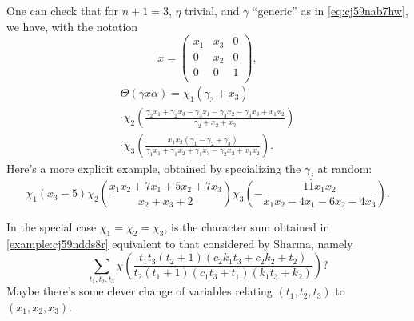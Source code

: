 \documentclass[reqno]{amsart} 
\begin{document}
\begin{example}\label{example:cj59ndds8r}
  One can check that for $n+1=3$, $\eta$ trivial, and $\gamma$ ``generic'' as in \eqref{eq:cj59nab7hw}, we have, with the notation
  \begin{equation*}
x =
\begin{pmatrix}
x_1 & x_3 & 0 \\
0 & x_2 & 0 \\
0 & 0 & 1 \\
\end{pmatrix},
\end{equation*}
  \begin{multline*}
    \Theta(\gamma x \alpha) =
    \chi_1 \left(
      \gamma_{3} + x_{3}
    \right)
    \\ \cdot 
    \chi_2 \left(
      \frac{\gamma_{2} x_{1} + \gamma_{2} x_{3} - \gamma_{3} x_{1} - \gamma_{3} x_{2} - \gamma_{3} x_{3} + x_{1} x_{2}}{\gamma_{2} + x_{2} + x_{3}}
    \right)
    \\ \cdot 
    \chi_3
    \left(
      \frac{x_{1} x_{2} (\gamma_{1} - \gamma_{2} + \gamma_{3})}{\gamma_{1} x_{1} + \gamma_{1} x_{2} + \gamma_{1} x_{3} - \gamma_{2} x_{2} + x_{1} x_{2}}
    \right).
  \end{multline*}
  Here's a more explicit example, obtained by specializing the $\gamma_j$ at random:
  \begin{equation*}
\chi_1 \left(
    x_{3} - 5
  \right)
  \chi_2 \left(
    \frac{x_{1} x_{2} + 7 x_{1} + 5 x_{2} + 7 x_{3}}{x_{2} + x_{3} + 2}\right)
  \chi_3 \left(
  - \frac{11 x_{1} x_{2}}{x_{1} x_{2} - 4 x_{1} - 6 x_{2} - 4 x_{3}}\right).
\end{equation*}
\end{example}

\begin{question}
  In the special case $\chi_1 = \chi_2 = \chi_3$, is the character sum obtained in \ref{example:cj59ndds8r} equivalent to that considered by Sharma, namely
  \begin{equation*}
    \sum_{t_1, t_2, t_3 }
    \chi \left( \frac{t_{1} t_{3} (t_{2} + 1) (c_{2} k_{1} t_{3} + c_{2} k_{2} + t_{2})}{t_{2} (t_{1} + 1) (c_{1} t_{3} + t_{1}) (k_{1} t_{3} + k_{2})} \right)?
  \end{equation*}
  Maybe there's some clever change of variables relating $(t_1, t_2 , t_3 )$ to $(x_1 , x_2 , x_3 )$.
\end{question}




{} 
\end{document}

